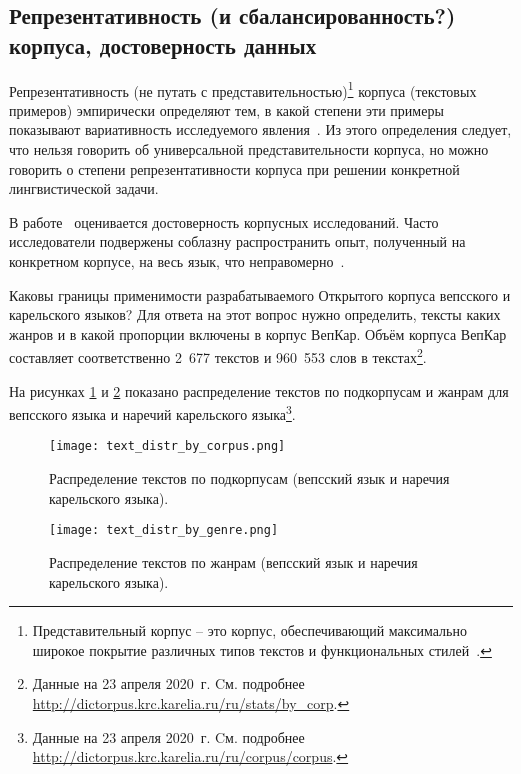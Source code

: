 
\subsection{Репрезентативность (и сбалансированность?) корпуса, достоверность данных} \label{sect_corpus_representativeness}

Репрезентативность 
(не путать с представительностью)\footnote{Представительный корпус -- 
это корпус, обеспечивающий максимально широкое покрытие  
различных типов текстов и функциональных стилей~\cite{Sharov2004}.
} 
корпуса (текстовых примеров) 
эмпирически определяют тем, в какой степени эти примеры показывают 
вариативность исследуемого явления~\cite{Biber1993representativeness}. 
Из этого определения следует, что нельзя говорить об универсальной 
представительности корпуса, но можно говорить 
о степени репрезентативности корпуса при решении конкретной лингвистической задачи.

В работе~\cite{Belikov2013}
оценивается достоверность корпусных исследований. 
Часто исследователи подвержены соблазну распространить опыт, полученный на конкретном корпусе, 
на весь язык, что неправомерно~\cite{Belikov2013}.

Каковы границы применимости разрабатываемого Открытого корпуса вепсского и карельского языков? 
Для ответа на этот вопрос нужно определить, тексты каких жанров и в какой пропорции включены в корпус ВепКар. 
Объём корпуса ВепКар составляет соответственно 2~677 текстов и 960~553 слов в текстах\footnote{ Данные на 23 апреля 2020~г. Cм. подробнее 
\href{http://dictorpus.krc.karelia.ru/ru/stats/by\_corp}{http://dictorpus.krc.karelia.ru/ru/stats/by\_corp}.}.

На рисунках \ref{fig:text_distr_by_corpus} и \ref{fig:text_distr_by_genre} показано распределение текстов по подкорпусам и жанрам для вепсского языка и наречий карельского языка\footnote{ Данные на 23 апреля 2020~г. Cм. подробнее 
			\href{http://dictorpus.krc.karelia.ru/ru/corpus/corpus}{http://dictorpus.krc.karelia.ru/ru/corpus/corpus}.}.

\begin{figure}
    \centering
    \texttt{[image: text\_distr\_by\_corpus.png]}
    \caption{Распределение текстов по подкорпусам (вепсский язык и наречия карельского языка).}
    \label{fig:text_distr_by_corpus}
\end{figure}

\begin{figure}
    \centering
    \texttt{[image: text\_distr\_by\_genre.png]}
    \caption{Распределение текстов по жанрам (вепсский язык и наречия карельского языка).}
    \label{fig:text_distr_by_genre}
\end{figure}

